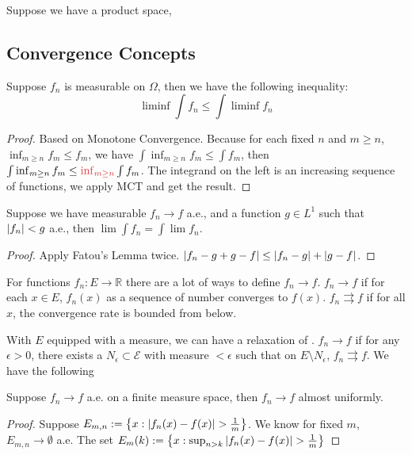 \begin{thm}
    Suppose we have a product space, 
\end{thm}

\subsection{Convergence Concepts}


\begin{thm}
    Suppose \(f_{n}\) is measurable on \(\Omega\), then we have the following inequality:
    \begin{equation*}
        \liminf \int f_{n} \leq \int \liminf f_{n}
    \end{equation*}
\end{thm}
\begin{proof}
    Based on Monotone Convergence. Because for each fixed \(n\) and \(m \geq n\), \(\inf_{m\geq n} f_{m} \leq f_{m}\), we have \(\int \inf_{m\geq n} f_{m} \leq \int f_{m}\), then \(\int \inf_{m\geq n} f_{m} \leq \red{\inf_{m \geq n}}\int f_{m}\). The integrand on the left is an increasing sequence of functions, we apply MCT and get the result. 
\end{proof}

\begin{thm}
    Suppose we have measurable \(f_{n} \to f\) a.e., and a function \(g \in L^{1}\) such that \(\abs{f_{n}} < g\) a.e., then \(\lim \int f_{n} = \int \lim f_{n}\). 
\end{thm}

\begin{proof}
    Apply Fatou's Lemma twice. \(\abs{f_{n} - g + g - f} \leq \abs{f_{n} - g} + \abs{g - f}\). 
\end{proof}

\begin{thm}
    
\end{thm}

For functions \(f_{n}: E \to \mathbb{R}\) there are a lot of ways to define \(f_{n} \to f\). 
\(f_{n} \to f\)  if for each \(x \in E\), \(f_{n}(x)\) as a sequence of number converges to \(f(x)\). \(f_{n} \rightrightarrows f\) if for all \(x\), the convergence rate is bounded from below. 

With \(E\) equipped with a measure, we can have a relaxation of . \(f_{n} \to f\)  if for any \(\epsilon> 0\), there exists a \(N_{\epsilon} \subset \mathcal{E}\) with measure \(< \epsilon\) such that on \(E\setminus N_{\epsilon}\), \(f_{n} \rightrightarrows f\). We have the following
\begin{thm}
    Suppose \(f_{n} \to f\) a.e. on a finite measure space, then \(f_{n} \to f\) almost uniformly. 
\end{thm}
\begin{proof}
    Suppose \(E_{m,n} := \Bqty{x: \abs{f_{n}(x) - f(x)} > \frac{1}{m}}\). We know for fixed \(m\), \(E_{m,n} \to \emptyset\) a.e. The set \(E_{m}(k):= \Bqty{x: \sup_{n > k} \abs{f_{n}(x) - f(x)} > \frac{1}{m}} \)  
\end{proof}

